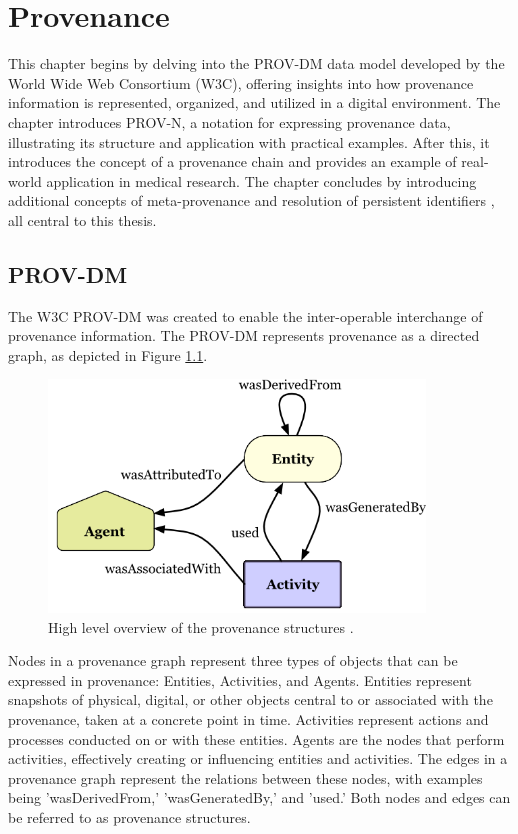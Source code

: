 \documentclass[
  digital,     %
  oneside,     %
  nosansbold,  %
  nocolorbold, %
  lof,         %
  lot,         %
]{fithesis4}
\begin{document}
\chapter{Provenance}
This chapter begins by delving into the PROV-DM data model developed by the World Wide Web Consortium (W3C), offering insights into how provenance information is represented, organized, and utilized in a digital environment. The chapter introduces PROV-N, a notation for expressing provenance data, illustrating its structure and application with practical examples. After this, it introduces the concept of a provenance chain and provides an example of real-world application in medical research. The chapter concludes by introducing additional concepts of meta-provenance \cite{provchain} and resolution of persistent identifiers \cite{pid}, all central to this thesis.

\section{PROV-DM} \label{provdm}
\shorthandoff{-}
The W3C PROV-DM was created to enable the inter-operable interchange of provenance information. The PROV-DM represents provenance as a directed graph, as depicted in Figure \ref{fig:provdm-basics}. 

\begin{figure}[htbp]
  \begin{center}
    \includegraphics[width=10cm]{fithesis/images/provdm-basics.png}
  \end{center}
  \caption{High level overview of the provenance structures \cite{provdm-basics}.}
  \label{fig:provdm-basics}
\end{figure}

Nodes in a provenance graph represent three types of objects that can be expressed in provenance: Entities, Activities, and Agents. Entities represent snapshots of physical, digital, or other objects central to or associated with the provenance, taken at a concrete point in time. Activities represent actions and processes conducted on or with these entities. Agents are the nodes that perform activities, effectively creating or influencing entities and activities. The edges in a provenance graph represent the relations between these nodes, with examples being 'wasDerivedFrom,' 'wasGeneratedBy,' and 'used.' Both nodes and edges can be referred to as provenance structures.
\end{document}

